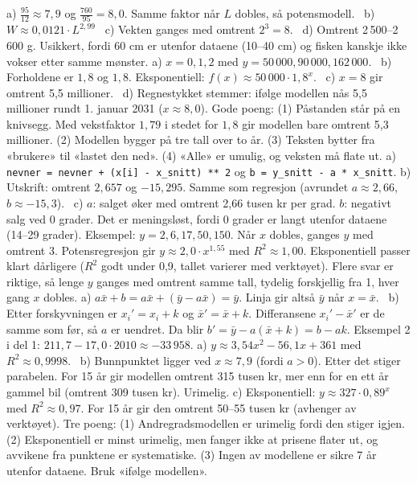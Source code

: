  a) $\frac{95}{12} \approx 7{,}9$ og $\frac{760}{95} = 8{,}0$. Samme faktor når $L$ dobles, så potensmodell. \ b) $W \approx 0{,}0121 \cdot L^{2{,}99}$ \ c) Vekten ganges med omtrent $2^{3} = 8$. \ d) Omtrent 2\,500–2\,600 g. Usikkert, fordi 60 cm er utenfor dataene (10–40 cm) og fisken kanskje ikke vokser etter samme mønster.
 a) $x = 0, 1, 2$ med $y = 50\,000, 90\,000, 162\,000$. \ b) Forholdene er $1{,}8$ og $1{,}8$. Eksponentiell: $f(x) \approx 50\,000 \cdot 1{,}8^x$. \ c) $x = 8$ gir omtrent 5,5 millioner. \ d) Regnestykket stemmer: ifølge modellen nås 5,5 millioner rundt 1. januar 2031 ($x \approx 8{,}0$). Gode poeng: (1) Påstanden står på en knivsegg. Med vekstfaktor $1{,}79$ i stedet for $1{,}8$ gir modellen bare omtrent 5,3 millioner. (2) Modellen bygger på tre tall over to år. (3) Teksten bytter fra «brukere» til «lastet den ned». (4) «Alle» er umulig, og veksten må flate ut.
 a) \lstinline[style=laereverk,numbers=none,frame=none]|nevner = nevner + (x[i] - x_snitt) ** 2| og \lstinline[style=laereverk,numbers=none,frame=none]|b = y_snitt - a * x_snitt|.
b) Utskrift: omtrent $2{,}657$ og $-15{,}295$. Samme som regresjon (avrundet $a \approx 2{,}66$, $b \approx -15{,}3$). \ c) $a$: salget øker med omtrent 2,66 tusen kr per grad. $b$: negativt salg ved 0 grader. Det er meningsløst, fordi 0 grader er langt utenfor dataene (14–29 grader).
 Eksempel: $y = 2, 6, 17, 50, 150$. Når $x$ dobles, ganges $y$ med omtrent 3. Potensregresjon gir $y \approx 2{,}0 \cdot x^{1{,}55}$ med $R^2 \approx 1{,}00$. Eksponentiell passer klart dårligere ($R^2$ godt under 0,9, tallet varierer med verktøyet). Flere svar er riktige, så lenge $y$ ganges med omtrent samme tall, tydelig forskjellig fra 1, hver gang $x$ dobles.
 a) $a \bar x + b = a \bar x + (\bar y - a \bar x) = \bar y$. Linja gir altså $\bar y$ når $x = \bar x$. \ b) Etter forskyvningen er $x_i' = x_i + k$ og $\bar x' = \bar x + k$. Differansene $x_i' - \bar x'$ er de samme som før, så $a$ er uendret. Da blir $b' = \bar y - a(\bar x + k) = b - ak$. Eksempel 2 i del 1: $211{,}7 - 17{,}0 \cdot 2010 \approx -33\,958$.
 a) $y \approx 3{,}54x^2 - 56{,}1x + 361$ med $R^2 \approx 0{,}9998$. \ b) Bunnpunktet ligger ved $x \approx 7{,}9$ (fordi $a > 0$). Etter det stiger parabelen. For 15 år gir modellen omtrent 315 tusen kr, mer enn for en ett år gammel bil (omtrent 309 tusen kr). Urimelig.
c) Eksponentiell: $y \approx 327 \cdot 0{,}89^x$ med $R^2 \approx 0{,}97$. For 15 år gir den omtrent 50–55 tusen kr (avhenger av verktøyet). Tre poeng: (1) Andregradsmodellen er urimelig fordi den stiger igjen. (2) Eksponentiell er minst urimelig, men fanger ikke at prisene flater ut, og avvikene fra punktene er systematiske. (3) Ingen av modellene er sikre 7 år utenfor dataene. Bruk «ifølge modellen».
